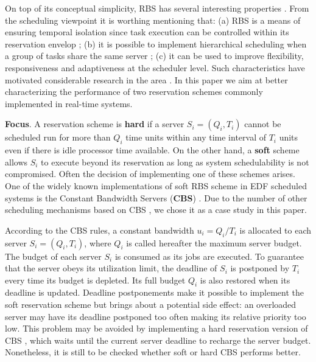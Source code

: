 \documentclass[times, 10pt,twocolumn]{article}
\begin{document}
On top of its conceptual simplicity, RBS has several interesting
properties \cite{steffens.ea03:resource}. From the scheduling
viewpoint it is worthing mentioning that: (a) RBS is a means of
ensuring temporal isolation since task execution can be controlled
within its reservation envelop
\cite{abeni.ea04:resource,mercer.ea94:processor,sprunt.ea89:aperiodic,spuri.ea96:scheduling};
(b) it is possible to implement hierarchical scheduling when a group
of tasks share the same server
\cite{davis.ea05:hierarchical,davis.ea08:investigation}; (c) it can be
used to improve flexibility, responsiveness and adaptiveness at the
scheduler level.  Such characteristics have motivated considerable
research in the area
\cite{abeni.ea99:adaptive,caccamo.ea00:capacity,caccamo.ea05:efficient,oliveira.ea08:dynamic,oliveira.ea09:dynamic,lin.ea05:improving}.
In this paper we aim at better characterizing the performance of two
reservation schemes commonly implemented in real-time systems.

\textbf{Focus}.  A reservation scheme is \textbf{hard} if a server
$S_i = (Q_i,T_i)$ cannot be scheduled run for more than $Q_i$ time
units within any time interval of $T_i$ units even if there is idle
processor time available. On the other hand, a \textbf{soft} scheme
allows $S_i$ to execute beyond its reservation as long as system
schedulability is not compromised. Often the decision of implementing
one of these schemes arises. One of the widely known implementations
of soft RBS scheme in EDF scheduled systems is the Constant Bandwidth
Servers (\textbf{CBS}) \cite{abeni.ea04:resource}.  Due to the number
of other scheduling mechanisms based on CBS
\cite{abeni.ea05:qos,caccamo.ea00:capacity,caccamo.ea05:efficient,lipari.ea00:greedy},
we chose it as a case study in this paper.

According to the CBS rules, a constant bandwidth $u_i = Q_i/T_i$ is
allocated to each server $S_i = (Q_i,T_i)$, where $Q_i$ is called
hereafter the maximum server budget. The budget of each server $S_i$
is consumed as its jobs are executed. To guarantee that the server
obeys its utilization limit, the deadline of $S_i$ is postponed by
$T_i$ every time its budget is depleted.  Its full budget $Q_i$ is
also restored when its deadline is updated.  Deadline postponements
make it possible to implement the soft reservation scheme but brings
about a potential side effect: an overloaded server may have its
deadline postponed too often making its relative priority too low.
This problem may be avoided by implementing a hard reservation version
of CBS \cite{buttazzo05:soft}, which waits until the current server
deadline to recharge the server budget.  Nonetheless, it is still to
be checked whether soft or hard CBS performs better.
\end{document}
